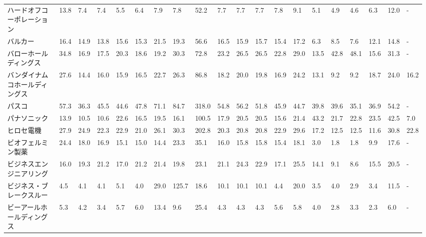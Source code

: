 \begin{longtable}[c]{lp{3mm}p{3mm}p{3mm}p{3mm}p{3mm}p{3mm}p{3mm}p{3mm}p{3mm}p{3mm}p{3mm}p{3mm}p{3mm}p{3mm}p{3mm}p{3mm}p{3mm}p{3mm}p{3mm}}
ハードオフコーポレーション   &   13.8 &    7.4 &       7.4 &       5.5 &        6.4 &     7.9 &     7.8 &     52.2 &     7.7 &     7.7 &    7.7 &    7.8 &     9.1 &     5.1 &     4.9 &    4.6 &    6.3 &    12.0 &      - \\
バルカー            &   16.4 &   14.9 &      13.8 &      15.6 &       15.3 &    21.5 &    19.3 &     56.6 &    16.5 &    15.9 &   15.7 &   15.4 &    17.2 &     6.3 &     8.5 &    7.6 &   12.1 &    14.8 &      - \\
バローホールディングス     &   34.8 &   16.9 &      17.5 &      20.3 &       18.6 &    19.2 &    30.3 &     72.8 &    23.2 &    26.5 &   26.5 &   22.8 &    29.0 &    13.5 &    42.8 &   48.1 &   15.6 &    31.3 &      - \\
バンダイナムコホールディングス &   27.6 &   14.4 &      16.0 &      15.9 &       16.5 &    22.7 &    26.3 &     86.8 &    18.2 &    20.0 &   19.8 &   16.9 &    24.2 &    13.1 &     9.2 &    9.2 &   18.7 &    24.0 &   16.2 \\
パスコ             &   57.3 &   36.3 &      45.5 &      44.6 &       47.8 &    71.1 &    84.7 &    318.0 &    54.8 &    56.2 &   51.8 &   45.9 &    44.7 &    39.8 &    39.6 &   35.1 &   36.9 &    54.2 &      - \\
パナソニック          &   13.9 &   10.5 &      10.6 &      22.6 &       16.5 &    19.5 &    16.1 &    100.5 &    17.9 &    20.5 &   20.5 &   15.6 &    21.4 &    43.2 &    21.7 &   22.8 &   23.5 &    42.5 &    7.0 \\
ヒロセ電機           &   27.9 &   24.9 &      22.3 &      22.9 &       21.0 &    26.1 &    30.3 &    202.8 &    20.3 &    20.8 &   20.8 &   22.9 &    29.6 &    17.2 &    12.5 &   12.5 &   11.6 &    30.8 &   22.8 \\
ビオフェルミン製薬       &   24.4 &   18.0 &      16.9 &      15.1 &       15.0 &    14.4 &    23.3 &     35.1 &    16.0 &    15.8 &   15.8 &   15.4 &    18.1 &     3.0 &     1.8 &    1.8 &    9.9 &    17.6 &      - \\
ビジネスエンジニアリング    &   16.0 &   19.3 &      21.2 &      17.0 &       21.2 &    21.4 &    19.8 &     23.1 &    21.1 &    24.3 &   22.9 &   17.1 &    25.5 &    14.1 &     9.1 &    8.6 &   15.5 &    20.5 &      - \\
ビジネス・ブレークスルー    &    4.5 &    4.1 &       4.1 &       5.1 &        4.0 &    29.0 &   125.7 &     18.6 &    10.1 &    10.1 &   10.1 &    4.4 &    20.0 &     3.5 &     4.0 &    2.9 &    3.4 &    11.5 &      - \\
ビーアールホールディングス   &    5.3 &    4.2 &       3.4 &       5.7 &        6.0 &    13.4 &     9.6 &     25.4 &     4.3 &     4.3 &    4.3 &    5.6 &     5.8 &     4.0 &     2.8 &    3.3 &    2.3 &     6.0 &      - \\

\end{longtable}
